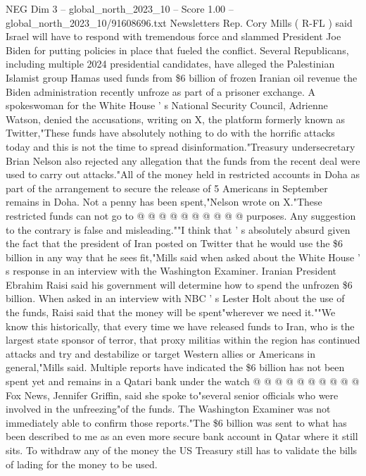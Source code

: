 \begin{textsample}{NEG Dim 3 – global\_north\_2023\_10 – Score 1.00 – global\_north\_2023\_10/91608696.txt}  \label{ex:f3_neg_188}
Newsletters Rep.
Cory Mills ( R-FL ) said Israel will have to respond with tremendous force and slammed President Joe Biden for putting policies in place that fueled the conflict.
Several Republicans, including multiple 2024 presidential candidates, have alleged the Palestinian Islamist group Hamas used funds from \$6 billion of frozen Iranian oil revenue the Biden administration recently unfroze as part of a prisoner exchange.
A spokeswoman for the White House ' s National Security Council, Adrienne Watson, denied the accusations, writing on X, the platform formerly known as Twitter,"These funds have absolutely nothing to do with the horrific attacks today and this is not the time to spread disinformation."Treasury undersecretary Brian Nelson also rejected any allegation that the funds from the recent deal were used to carry out attacks."All of the money held in restricted accounts in Doha as part of the arrangement to secure the release of 5 Americans in September remains in Doha.
Not a penny has been spent,"Nelson wrote on X."These restricted funds can not go to @ @ @ @ @ @ @ @ @ @ purposes.
Any suggestion to the contrary is false and misleading.""I think that ' s absolutely absurd given the fact that the president of Iran posted on Twitter that he would use the \$6 billion in any way that he sees fit,"Mills said when asked about the White House ' s response in an interview with the Washington Examiner.
Iranian President Ebrahim Raisi said his government will determine how to spend the unfrozen \$6 billion.
When asked in an interview with NBC ' s Lester Holt about the use of the funds, Raisi said that the money will be spent"wherever we need it.""We know this historically, that every time we have released funds to Iran, who is the largest state sponsor of terror, that proxy militias within the region has continued attacks and try and destabilize or target Western allies or Americans in general,"Mills said.
Multiple reports have indicated the \$6 billion has not been spent yet and remains in a Qatari bank under the watch @ @ @ @ @ @ @ @ @ @ Fox News, Jennifer Griffin, said she spoke to"several senior officials who were involved in the unfreezing"of the funds.
The Washington Examiner was not immediately able to confirm those reports."The \$6 billion was sent to what has been described to me as an even more secure bank account in Qatar where it still sits.
To withdraw any of the money the US Treasury still has to validate the bills of lading for the money to be used.

\end{textsample}
